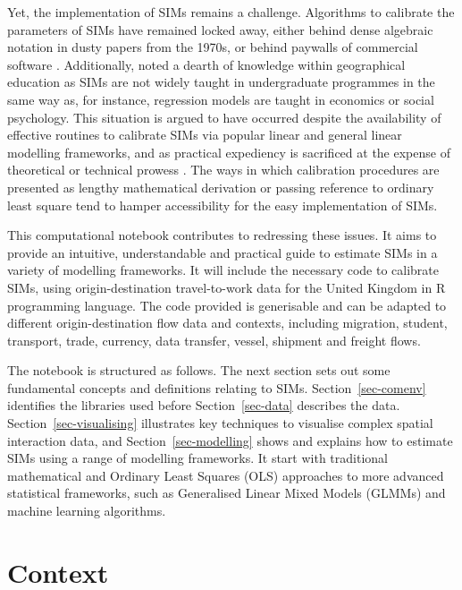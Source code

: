 \documentclass[
  a4paper, 
  twoside,
  final
]{article}
\newcounter{code}
\begin{document}
Yet, the implementation of SIMs remains a challenge. Algorithms to
calibrate the parameters of SIMs have remained locked away, either
behind dense algebraic notation in dusty papers from the 1970s, or
behind paywalls of commercial software \citep{rowe2024}. Additionally,
\citet{rowe2024} noted a dearth of knowledge within geographical
education as SIMs are not widely taught in undergraduate programmes in
the same way as, for instance, regression models are taught in economics
or social psychology. This situation is argued to have occurred despite
the availability of effective routines to calibrate SIMs via popular
linear and general linear modelling frameworks, and as practical
expediency is sacrificed at the expense of theoretical or technical
prowess \citep{rowe2024}. The ways in which calibration procedures are
presented as lengthy mathematical derivation or passing reference to
ordinary least square tend to hamper accessibility for the easy
implementation of SIMs.

This computational notebook contributes to redressing these issues. It
aims to provide an intuitive, understandable and practical guide to
estimate SIMs in a variety of modelling frameworks. It will include the
necessary code to calibrate SIMs, using origin-destination
travel-to-work data for the United Kingdom in R programming language.
The code provided is generisable and can be adapted to different
origin-destination flow data and contexts, including migration, student,
transport, trade, currency, data transfer, vessel, shipment and freight
flows.

The notebook is structured as follows. The next section sets out some
fundamental concepts and definitions relating to SIMs.
Section~\ref{sec-comenv} identifies the libraries used before
Section~\ref{sec-data} describes the data. Section~\ref{sec-visualising}
illustrates key techniques to visualise complex spatial interaction
data, and Section~\ref{sec-modelling} shows and explains how to estimate
SIMs using a range of modelling frameworks. It start with traditional
mathematical and Ordinary Least Squares (OLS) approaches to more
advanced statistical frameworks, such as Generalised Linear Mixed Models
(GLMMs) and machine learning algorithms.

\hypertarget{context}{%
\section{Context}\label{context}}
\end{document}
